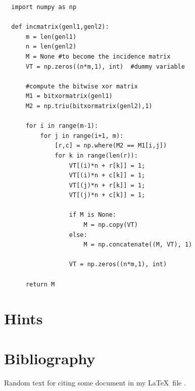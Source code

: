 \documentclass[12pt]{scrartcl}
\begin{document}
\begin{verbatim}
  import numpy as np

  def incmatrix(genl1,genl2):
      m = len(genl1)
      n = len(genl2)
      M = None #to become the incidence matrix
      VT = np.zeros((n*m,1), int)  #dummy variable

      #compute the bitwise xor matrix
      M1 = bitxormatrix(genl1)
      M2 = np.triu(bitxormatrix(genl2),1)

      for i in range(m-1):
          for j in range(i+1, m):
              [r,c] = np.where(M2 == M1[i,j])
              for k in range(len(r)):
                  VT[(i)*n + r[k]] = 1;
                  VT[(i)*n + c[k]] = 1;
                  VT[(j)*n + r[k]] = 1;
                  VT[(j)*n + c[k]] = 1;

                  if M is None:
                      M = np.copy(VT)
                  else:
                      M = np.concatenate((M, VT), 1)

                  VT = np.zeros((n*m,1), int)

      return M
\end{verbatim}

\newpage

\section{Hints}

\printhint

\newpage

\section{Bibliography}

Random text for citing some document in my \LaTeX\ file \cite{knuth1997}.

\printbibliography
\end{document}
